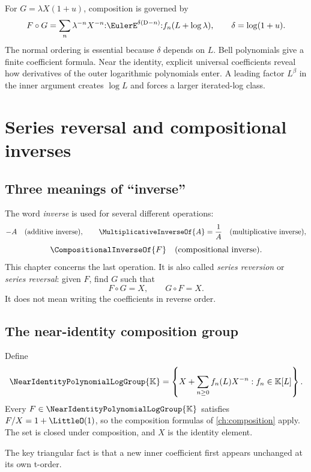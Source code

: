 \documentclass[11pt,openany]{book}
\theoremstyle{definition}
\theoremstyle{plain}
\theoremstyle{remark}
\newcommand{\K}{\mathbb{K}}
\newcommand{\rev}[1]{\CompositionalInverseOf{#1}}
\newcommand{\recip}[1]{\MultiplicativeInverseOf{#1}}
\newcommand{\Dop}{\mathrm{D}}
\newcommand{\compose}{\mathbin{\circ}}
\begin{document}
\begin{summarybox}
For \(G=\lambda X(1+u)\), composition is governed by
\[
 F\compose G
 =\sum_n\lambda^{-n}X^{-n}
 \mathopen{:}\EulerE^{\delta(\Dop-n)}\mathclose{:}
 f_n(L+\log\lambda),
 \qquad \delta=\log(1+u).
\]
The normal ordering is essential because \(\delta\) depends on \(L\).  Bell
polynomials give a finite coefficient formula.  Near the identity, explicit
universal coefficients reveal how derivatives of the outer logarithmic
polynomials enter.  A leading factor \(L^\beta\) in the inner argument creates
\(\log L\) and forces a larger iterated-log class.
\end{summarybox}

\chapter{Series reversal and compositional inverses}\label{ch:reversion}

\section{Three meanings of ``inverse''}
The word \emph{inverse} is used for several different operations:
\[
 -A\quad\text{(additive inverse)},
 \qquad
 \recip{A}=\frac1A\quad\text{(multiplicative inverse)},
\]
\[
 \rev{F}\quad\text{(compositional inverse)}.
\]
This chapter concerns the last operation.  It is also called \emph{series
reversion} or \emph{series reversal}: given \(F\), find \(G\) such that
\begin{equation}\label{eq:inverse-equations}
 F\compose G=X,
 \qquad
 G\compose F=X.
\end{equation}
It does not mean writing the coefficients in reverse order.

\section{The near-identity composition group}
Define
\begin{equation}\label{eq:near-id-group}
 \NearIdentityPolynomialLogGroup{\K}=
 \left\{
 X+\sum_{n\ge0}f_n(L)X^{-n}: f_n\in\K[L]
 \right\}.
\end{equation}
Every \(F\in\NearIdentityPolynomialLogGroup{\K}\) satisfies \(F/X=1+\LittleO(1)\), so the composition formulas of
\cref{ch:composition} apply.  The set is closed under composition, and \(X\)
is the identity element.

The key triangular fact is that a new inner coefficient first appears
unchanged at its own t-order.
\end{document}
